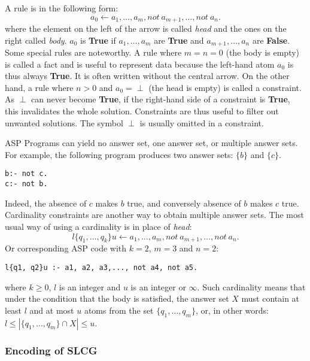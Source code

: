 A rule is in the following form:
$$a_0 \gets a_1 , \ldots , a_m, not\ a_{m+1}, \ldots , not\ a_n.$$
where the element on the left of the arrow is called \textit{head} and the ones on the right called \textit{body}.
$a_0$ is \textbf{True} if $a_1 , \ldots , a_m$ are \textbf{True} and $a_{m+1}, \ldots , a_n$ are \textbf{False}.
Some special rules are noteworthy. 
A rule where $m = n = 0$ (the body is empty) is called a fact and is useful to represent data because the left-hand atom $a_0$ is thus always \textbf{True}.
It is often written without the central arrow.
On the other hand, a rule where $n > 0$ and $a_0 = \perp$ (the head is empty) is called a constraint.
As $\perp$ can never become \textbf{True}, if the right-hand side of a constraint is \textbf{True}, this invalidates the whole solution.
Constraints are thus useful to filter out unwanted solutions.
The symbol $\perp$ is usually omitted in a constraint.

ASP Programs can yield no answer set, one answer set, or multiple answer sets. 
For example, the following program produces two answer sets: $\{b\}$ and $\{c\}$.

\begin{Verbatim}[commandchars=\\\{\}]
b:- not c. 
c:- not b.
\end{Verbatim}

Indeed, the absence of $c$ makes $b$ true, and conversely absence of $b$ makes $c$ true. 
Cardinality constraints are another way to obtain multiple answer sets. 
The most usual way of using a cardinality is in place of \textit{head}:
$$l \{q_1, \ldots , q_k \} u \gets a_1, \ldots , a_m, not\ a_{m+1}, \ldots , not\ a_n.$$
Or corresponding ASP code with $k=2$, $m=3$ and $n=2$:
\begin{verbatim}
l{q1, q2}u :- a1, a2, a3,..., not a4, not a5.
\end{verbatim}
where $k \geq 0$, $l$ is an integer and $u$ is an integer or $\infty$. 
Such cardinality means that under the condition that the body is satisfied, the answer set $X$ must contain at least $l$ and at most $u$ atoms from the set $\{q_1, \ldots  , q_m\}$, or, in other words: $l \leq |\{q_1, \ldots  , q_m\} \cap X| \leq u$. %

\subsubsection{Encoding of SLCG}

